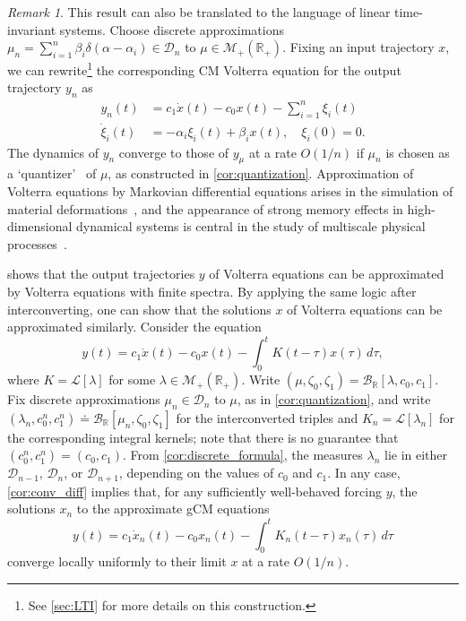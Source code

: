 \documentclass{cams-l} %
\newcommand{\dave}[1]{#1}\newcommand{\davebegin}{}\newcommand{\daveend}{}\newcommand{\george}[1]{#1}
\newcommand{\RR}{\mathbb R}
\newcommand{\cL}{\mathcal L}
\newcommand{\cM}{\mathcal M}
\newcommand{\cB}{\mathcal B}
\newcommand{\cD}{\mathcal D}
\newcommand{\tsum}{\sum\nolimits}
\theoremstyle{definition}
\theoremstyle{remark}
\newtheorem{remark}[theorem]{Remark}
\numberwithin{equation}{section}
\begin{document}
\begin{remark}
    This result can \dave{also be translated} to the language of linear time-invariant systems. Choose discrete approximations $\mu_n =\tsum_{i=1}^n \beta_i\delta(\alpha - \alpha_i)\in\cD_n$ to $\mu\in\cM_+(\RR_+)$. Fixing an input trajectory $x$, we can rewrite\footnote{See \cref{sec:LTI} for more details on \dave{this construction}.} the corresponding CM Volterra equation for the output trajectory $y_n$ as
    \begin{align*}
        y_n(t) &= c_1\dot{x}(t) - c_0x(t) - \sum_{i=1}^n\xi_i(t)\\
        \dot{\xi}_i(t) &= -\alpha_i\xi_i(t) + \beta_ix(t), \quad \xi_i(0) = 0.
    \end{align*}
    \dave{The dynamics of $y_n$ converge to those of $y_\mu$} at a rate $O(1/n)$ if $\mu_n$ is chosen as a `quantizer'~\cite{bourne2018semi} of $\mu$, as constructed in \cref{cor:quantization}. Approximation of Volterra equations by Markovian differential equations arises in the simulation of material deformations~\cite{bhattacharya2023learning}, and the appearance of strong memory effects in high-dimensional dynamical systems is central in the study of multiscale physical processes~\cite{givon2004extracting}.
\end{remark}

 shows that the output trajectories $y$ of Volterra equations can be approximated by Volterra equations with finite spectra. By applying the same logic after interconverting, one can show that the solutions $x$ of Volterra equations can be approximated similarly. Consider the equation
\[y(t) = c_1\dot{x}(t) - c_0x(t) - \int_0^t K(t-\tau)x(\tau)\,d\tau,\]
where $K = \cL[\lambda]$ for some $\lambda\in\cM_+(\RR_+)$. Write $(\mu,\zeta_0,\zeta_1)=\cB_\RR[\lambda,c_0,c_1]$. Fix discrete approximations $\mu_n\in\cD_n$ to $\mu$, as in \cref{cor:quantization}, and write $(\lambda_n,c_0^n,c_1^n) \doteq \cB_\RR[\mu_n,\zeta_0,\zeta_1]$ for the interconverted triples and $K_n=\cL[\lambda_n]$ for the corresponding integral kernels; note that there is no guarantee that $(c_0^n, c_1^n) = (c_0, c_1)$. From \cref{cor:discrete_formula}, the measures $\lambda_n$ lie in either $\cD_{n-1}$, $\cD_n$, or $\cD_{n+1}$, depending on the values of $c_0$ and $c_1$. In any case, \cref{cor:conv_diff} implies that, for any sufficiently well-behaved forcing $y$, the solutions $x_{n}$ to the approximate gCM equations 
\[y(t) = c_1\dot{x}_n(t) - c_0x_n(t) - \int_0^t K_n(t-\tau)x_n(\tau)\,d\tau\]
converge locally uniformly to their limit $x$ at a rate $O(1/n)$.
\end{document}
